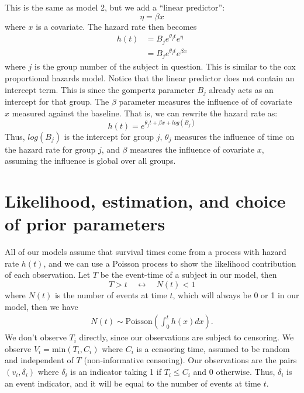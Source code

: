 \documentclass[12pt]{article}
\begin{document}
This is the same as model 2, but we add a ``linear predictor'':
\begin{equation}
\eta =  \beta x
\end{equation}
where $x$ is a covariate.
The hazard rate then becomes
\begin{align*}
h(t)
&= B_j e^{\theta_j t} e^{\eta} \\
&= B_j e^{\theta_j t} e^{ \beta x }
\end{align*}
where $j$ is the group number of the subject in question. This is
similar to the cox proportional hazards model. Notice that the linear
predictor does not contain an intercept term. This is since the gompertz
parameter $B_j$ already acts as an intercept for that group. The
$\beta$ parameter measures the influence of of covariate $x$
measured against the baseline. That is, we can rewrite the hazard rate
as:
\begin{equation*}
h(t) = e^{ \theta_j t  + \beta x + log\left(B_j\right) }
\end{equation*}
Thus, $log\left(B_j\right)$ is the intercept for group $j$,
$\theta_j$ measures the influence of time on the hazard rate for group
$j$, and $\beta$ measures the influence of covariate $x$, assuming
the influence is global over all groups.

\section{Likelihood, estimation, and choice of prior parameters}
\label{sec:likelihoodandpriors}

All of our models assume that survival times come from a process with
hazard rate $h(t)$, and we can use a Poisson process to show the
likelihood contribution of each observation. Let $T$ be the event-time
of a subject in our model, then
\begin{equation*}
T > t \quad \longleftrightarrow \quad N(t) < 1
\end{equation*}
where $N(t)$ is the number of events at time $t$, which will always
be 0 or 1 in our model, then we have
\begin{align*}
N(t) \sim \text{Poisson}\left( \int_0^t{h(x)dx} \right)
\text{.}
\end{align*}
We don't observe $T_i$ directly, since our observations are subject to
censoring. We observe $V_i = \text{min}(T_i, C_i)$ where $C_i$ is a
censoring time, assumed to be random and independent of $T$
(non-informative censoring). Our observations are the pairs
$(v_i, \delta_i)$ where $\delta_i$ is an indicator taking 1 if
$T_i \leq C_i$ and 0 otherwise. Thus, $\delta_i$ is an event
indicator, and it will be equal to the number of events at time $t$.
\end{document}

